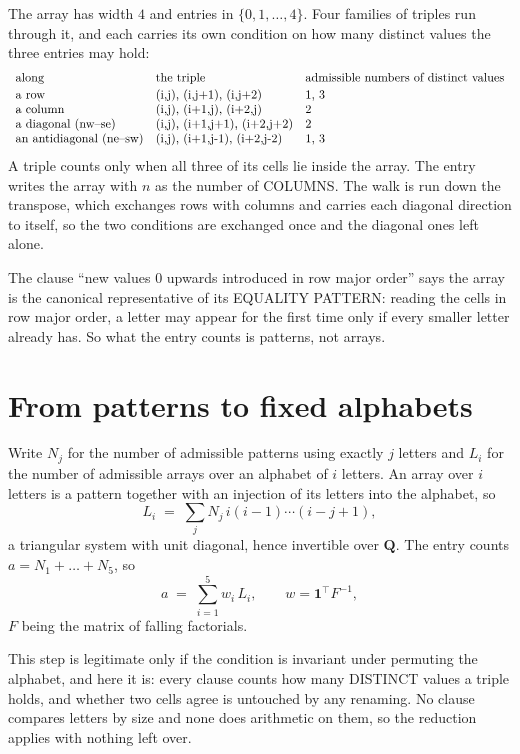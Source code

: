 \documentclass[11pt,a4paper]{article}
\theoremstyle{plain}
\theoremstyle{definition}
\begin{document}
The array has width $4$ and entries in $\{0,1,\dots,4\}$. Four families of triples
run through it, and each carries its own condition on how many distinct values the three
entries may hold:
\[
\begin{array}{lll}
\text{along} & \text{the triple} & \text{admissible numbers of distinct values} \\[2pt]
\text{a row} & $(i,j),\ (i,j+1),\ (i,j+2)$ & $1, 3$ \\
\text{a column} & $(i,j),\ (i+1,j),\ (i+2,j)$ & $2$ \\
\text{a diagonal (nw--se)} & $(i,j),\ (i+1,j+1),\ (i+2,j+2)$ & $2$ \\
\text{an antidiagonal (ne--sw)} & $(i,j),\ (i+1,j-1),\ (i+2,j-2)$ & $1, 3$ \\
\end{array}
\]
A triple counts only when all three of its cells lie inside the array. The entry writes the array with $n$ as the number of COLUMNS. The walk is run down the transpose, which exchanges rows with columns and carries each diagonal direction to itself, so the two conditions are exchanged once and the diagonal ones left alone.

The clause ``new values $0$ upwards introduced in row major order'' says the array is the
canonical representative of its EQUALITY PATTERN: reading the cells in row major order, a
letter may appear for the first time only if every smaller letter already has. So what the
entry counts is patterns, not arrays.

\section{From patterns to fixed alphabets}

Write $N_j$ for the number of admissible patterns using exactly $j$ letters and $L_i$ for the
number of admissible arrays over an alphabet of $i$ letters. An array over $i$ letters is a
pattern together with an injection of its letters into the alphabet, so
\[
L_i\;=\;\sum_j N_j\,i(i-1)\cdots(i-j+1),
\]
a triangular system with unit diagonal, hence invertible over $\mathbf{Q}$. The entry counts
$a=N_1+\dots+N_{5}$, so
\[
a\;=\;\sum_{i=1}^{5}w_i\,L_i ,\qquad w=\mathbf{1}^{\!\top}F^{-1},
\]
$F$ being the matrix of falling factorials.

This step is legitimate only if the condition is invariant under permuting the alphabet, and
here it is: every clause counts how many DISTINCT values a triple holds, and whether two cells
agree is untouched by any renaming. No clause compares letters by size and none does arithmetic
on them, so the reduction applies with nothing left over.
\end{document}
